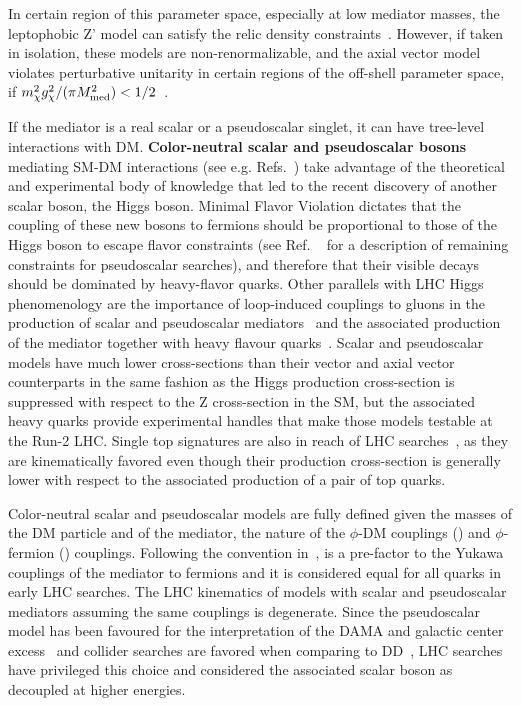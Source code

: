 In certain region of this parameter space, especially at low mediator masses, the leptophobic Z' model can satisfy the relic density constraints~\cite{Chala:2015ama}. However, if taken in isolation, these models are  non-renormalizable, and the axial vector model violates perturbative unitarity in certain regions of the off-shell parameter space, if $m_{\chi}^2g_{\chi}^2/(\pi M_{\rm{med}}^2)<1/2$~\cite{Chala:2015ama,Kahlhoefer:2015bea,Boveia:2016mrp}. 

If the mediator is a real scalar or a pseudoscalar singlet, it can have tree-level interactions with DM.
\textbf{Color-neutral scalar and pseudoscalar bosons} mediating SM-DM interactions (see e.g. Refs.~\cite{Buckley:2014fba}) take advantage of the theoretical and experimental body of knowledge that led to the recent discovery of another scalar boson, the Higgs boson. Minimal Flavor Violation dictates that the coupling of these new bosons to fermions should be proportional to those of the Higgs boson to escape flavor constraints (see Ref. ~\cite{Dolan:2014ska} for a description of remaining constraints for pseudoscalar searches), and therefore that their visible decays should be dominated by heavy-flavor quarks. Other parallels with LHC Higgs phenomenology are the importance of loop-induced couplings to gluons in the production of scalar and pseudoscalar mediators~\cite{Haisch:2015ioa,Mattelaer:2015haa} and the associated production of the mediator together with heavy flavour quarks~\cite{Buckley:2014fba}. Scalar and pseudoscalar models have much lower cross-sections than their vector and axial vector counterparts in the same fashion as the Higgs production cross-section is suppressed with respect to the Z cross-section in the SM, but the associated heavy quarks provide experimental handles that make those models testable at the Run-2 LHC. Single top signatures are also in reach of LHC searches~\cite{Pinna:2017tay}, as they are kinematically favored even though their production cross-section is generally lower with respect to the associated production of a pair of top quarks. %

Color-neutral scalar and pseudoscalar models are fully defined given the masses of the DM particle and of the mediator, the nature of the $\phi$-DM couplings (\gdm) and $\phi$-fermion (\gq) couplings. Following the convention in~\cite{Abercrombie:2015wmb}, \gq is a pre-factor to the Yukawa couplings of the mediator to fermions and it is considered equal for all quarks in early LHC searches. 
The LHC kinematics of models with scalar and pseudoscalar mediators assuming the same couplings is degenerate. Since the pseudoscalar model has been favoured for the interpretation of the DAMA and galactic center excess~\cite{Arina:2014yna,Agrawal:2014una} and collider searches are favored when comparing to DD~\cite{Banerjee:2017wxi}, LHC searches have privileged this choice and considered the associated scalar boson as decoupled at higher energies. 

